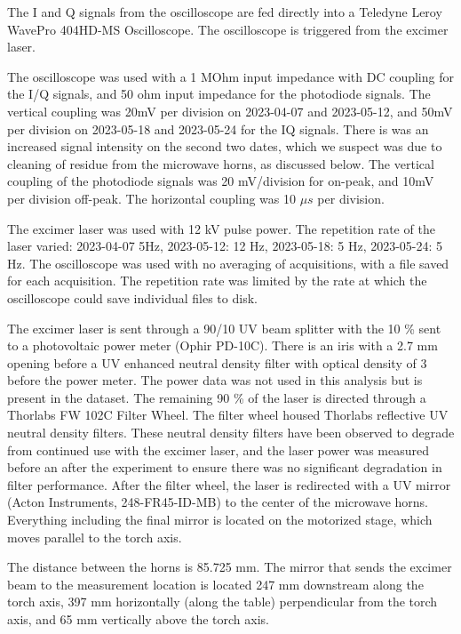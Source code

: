 
The I and Q signals from the oscilloscope are fed directly into a Teledyne Leroy WavePro 404HD-MS Oscilloscope.  The oscilloscope is triggered from the excimer laser. 

The oscilloscope was used with a 1 MOhm input impedance with DC coupling for the I/Q signals, and 50 ohm input impedance for the photodiode signals. The vertical coupling was 20mV per division on 2023-04-07 and 2023-05-12, and 50mV per division on 2023-05-18 and 2023-05-24 for the IQ signals. There is was an increased signal intensity on the second two dates, which we suspect was due to cleaning of residue from the microwave horns, as discussed below. The vertical coupling of the photodiode signals was 20 mV/division for on-peak, and 10mV per division off-peak. The horizontal coupling was 10 $\mu s$ per division. 

The excimer laser was used with 12 kV pulse power. The repetition rate of the laser varied: 2023-04-07 5Hz, 2023-05-12: 12 Hz, 2023-05-18: 5 Hz, 2023-05-24: 5 Hz. The oscilloscope was used with no averaging of acquisitions, with a file saved for each acquisition. The repetition rate was limited by the rate at which the oscilloscope could save individual files to disk. 

The excimer laser is sent through a 90/10 UV beam splitter with the 10 \% sent to a photovoltaic power meter (Ophir PD-10C). There is an iris with a 2.7  mm opening before a UV enhanced neutral density filter with optical density of 3 before the power meter. The power data was not used in this analysis but is present in the dataset. The remaining 90 \% of the laser is directed through a Thorlabs FW 102C Filter Wheel. The filter wheel housed Thorlabs reflective UV neutral density filters. These neutral density filters have been observed to degrade from continued use with the excimer laser, and the laser power was measured before an after the experiment to ensure there was no significant degradation in filter performance. After the filter wheel, the laser is redirected with a UV mirror (Acton Instruments, 248-FR45-ID-MB) to the center of the microwave horns. Everything including the final mirror is located on the motorized stage, which moves parallel to the torch axis.  

The distance between the horns is 85.725 mm. The mirror that sends the excimer beam to the measurement location is located 247 mm downstream along the torch axis, 397 mm horizontally (along the table) perpendicular from the torch axis, and 65 mm vertically above the torch axis. 


